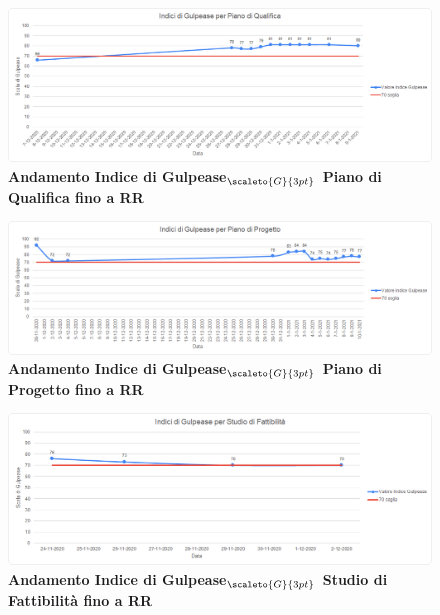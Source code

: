 {\begin{figure}[!h]
	\begin{center}
		\includegraphics[width=1\linewidth]{../immagini/IndexGulpeasePdQ.png}
		\caption{\textbf{Andamento Indice di Gulpease$_{\scaleto{G}{3pt}}$ Piano di Qualifica fino a RR}}
	\end{center}
\end{figure}

\begin{figure}[!h]
	\begin{center}
		\includegraphics[width=1\linewidth]{../immagini/IndexGulpeasePdP.png}
		\caption{\textbf{Andamento Indice di Gulpease$_{\scaleto{G}{3pt}}$ Piano di Progetto fino a RR}}
	\end{center}
\end{figure}

\begin{figure}[!h]
	\begin{center}
		\includegraphics[width=1\linewidth]{../immagini/IndexGulpeaseSdF.png}
		\caption{\textbf{Andamento Indice di Gulpease$_{\scaleto{G}{3pt}}$ Studio di Fattibilità fino a RR}}
	\end{center}
\end{figure}
\clearpage

}
